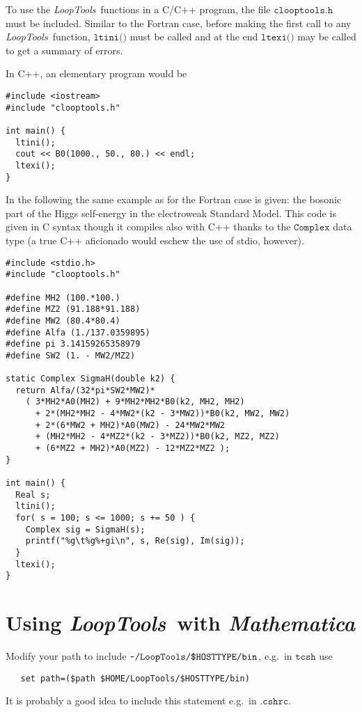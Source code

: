 \documentclass[twoside,12pt]{report}
\def\LT{\textit{LoopTools}}
\def\mma{{\it Mathematica}}
\def\eg{e.g.\ }
\def\home{\symbol{126}}
\def\Code#1{\ensuremath{\texttt{#1}}}
\begin{document}
To use the \LT\ functions in a C/C++ program, the file 
\Code{clooptools.h} must be included.  Similar to the Fortran case, 
before making the first call to any \LT\ function, \Code{ltini()} must 
be called and at the end \Code{ltexi()} may be called to get a summary 
of errors.

In C++, an elementary program would be
{\samepage
\begin{verbatim}
#include <iostream>
#include "clooptools.h"

int main() {
  ltini();
  cout << B0(1000., 50., 80.) << endl;
  ltexi();
}
\end{verbatim}}

In the following the same example as for the Fortran case is given: the
bosonic part of the Higgs self-energy in the electroweak Standard Model.
This code is given in C syntax though it compiles also with C++ thanks 
to the \Code{Complex} data type (a true C++ aficionado would eschew the 
use of stdio, however).
\begin{verbatim}
#include <stdio.h>
#include "clooptools.h"

#define MH2 (100.*100.)
#define MZ2 (91.188*91.188)
#define MW2 (80.4*80.4)
#define Alfa (1./137.0359895)
#define pi 3.14159265358979
#define SW2 (1. - MW2/MZ2)

static Complex SigmaH(double k2) {
  return Alfa/(32*pi*SW2*MW2)*
    ( 3*MH2*A0(MH2) + 9*MH2*MH2*B0(k2, MH2, MH2)
      + 2*(MH2*MH2 - 4*MW2*(k2 - 3*MW2))*B0(k2, MW2, MW2)
      + 2*(6*MW2 + MH2)*A0(MW2) - 24*MW2*MW2
      + (MH2*MH2 - 4*MZ2*(k2 - 3*MZ2))*B0(k2, MZ2, MZ2)
      + (6*MZ2 + MH2)*A0(MZ2) - 12*MZ2*MZ2 );
}

int main() {
  Real s;
  ltini();
  for( s = 100; s <= 1000; s += 50 ) {
    Complex sig = SigmaH(s);
    printf("%g\t%g%+gi\n", s, Re(sig), Im(sig));
  }
  ltexi();
}
\end{verbatim}


\section{Using \LT\ with \mma}

\index{Mathematica@\mma}%
%
Modify your path to include \Code{\home/LoopTools/\$HOSTTYPE/bin}, \eg in
\Code{tcsh} use
\begin{verbatim}
   set path=($path $HOME/LoopTools/$HOSTTYPE/bin)
\end{verbatim}
It is probably a good idea to include this statement \eg in \Code{.cshrc}.
\end{document}
